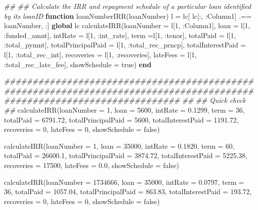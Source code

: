\documentclass[11pt,]{report}
\newenvironment{Shaded}{\begin{snugshade}}{\end{snugshade}}
\newcommand{\CommentTok}[1]{\textcolor[rgb]{0.56,0.35,0.01}{\textit{#1}}}
\newcommand{\FloatTok}[1]{\textcolor[rgb]{0.00,0.00,0.81}{#1}}
\newcommand{\KeywordTok}[1]{\textcolor[rgb]{0.13,0.29,0.53}{\textbf{#1}}}
\newcommand{\NormalTok}[1]{#1}
\begin{document}
\begin{Shaded}
\begin{Highlighting}[numbers=left,,]
\CommentTok{##}
\CommentTok{## Calculate the IRR and repayment schedule of a particular loan identified by its loanID}
\KeywordTok{function}\NormalTok{ loanNumberIRR(loanNumber)}
\NormalTok{  l = lc[ lc[:, :Column1] .== loanNumber, :]}
  \KeywordTok{global}\NormalTok{ lc}
\NormalTok{  calculateIRR(loanNumber = l[}\FloatTok{1}\NormalTok{, :Column1],}
\NormalTok{               loan = l[}\FloatTok{1}\NormalTok{, :funded_amnt], intRate = l[}\FloatTok{1}\NormalTok{, :int_rate], term =l[}\FloatTok{1}\NormalTok{, :tenor],}
\NormalTok{               totalPaid = l[}\FloatTok{1}\NormalTok{, :total_pymnt], totalPrincipalPaid = l[}\FloatTok{1}\NormalTok{, :total_rec_prncp],}
\NormalTok{               totalInterestPaid = l[}\FloatTok{1}\NormalTok{, :total_rec_int],}
\NormalTok{               recoveries = l[}\FloatTok{1}\NormalTok{, :recoveries], lateFees = l[}\FloatTok{1}\NormalTok{, :total_rec_late_fee],}
\NormalTok{               showSchedule = true)}
\KeywordTok{end}


\CommentTok{#######################################################################################################################}
\CommentTok{##}
\CommentTok{## Quick check}
\CommentTok{##}
\NormalTok{calculateIRR(loanNumber = }\FloatTok{1}\NormalTok{, loan = }\FloatTok{5600}\NormalTok{, intRate = }\FloatTok{0.1299}\NormalTok{, term = }\FloatTok{36}\NormalTok{,}
\NormalTok{             totalPaid = }\FloatTok{6791.72}\NormalTok{, totalPrincipalPaid = }\FloatTok{5600}\NormalTok{, totalInterestPaid = }\FloatTok{1191.72}\NormalTok{,}
\NormalTok{             recoveries = }\FloatTok{0}\NormalTok{, lateFees = }\FloatTok{0}\NormalTok{,}
\NormalTok{             showSchedule = false)}

\NormalTok{calculateIRR(loanNumber = }\FloatTok{1}\NormalTok{, loan = }\FloatTok{35000}\NormalTok{, intRate = }\FloatTok{0.1820}\NormalTok{, term = }\FloatTok{60}\NormalTok{,}
\NormalTok{             totalPaid = }\FloatTok{26600.1}\NormalTok{, totalPrincipalPaid = }\FloatTok{3874.72}\NormalTok{, totalInterestPaid = }\FloatTok{5225.38}\NormalTok{,}
\NormalTok{             recoveries = }\FloatTok{17500}\NormalTok{, lateFees = }\FloatTok{0.0}\NormalTok{,}
\NormalTok{             showSchedule = false)}

\NormalTok{calculateIRR(loanNumber = }\FloatTok{1734666}\NormalTok{, loan = }\FloatTok{35000}\NormalTok{, intRate = }\FloatTok{0.0797}\NormalTok{, term = }\FloatTok{36}\NormalTok{,}
\NormalTok{             totalPaid = }\FloatTok{1057.04}\NormalTok{, totalPrincipalPaid = }\FloatTok{863.83}\NormalTok{, totalInterestPaid = }\FloatTok{193.72}\NormalTok{,}
\NormalTok{             recoveries = }\FloatTok{0}\NormalTok{, lateFees = }\FloatTok{0}\NormalTok{,}
\NormalTok{             showSchedule = false)}





\end{Highlighting}
\end{Shaded}
\end{document}
